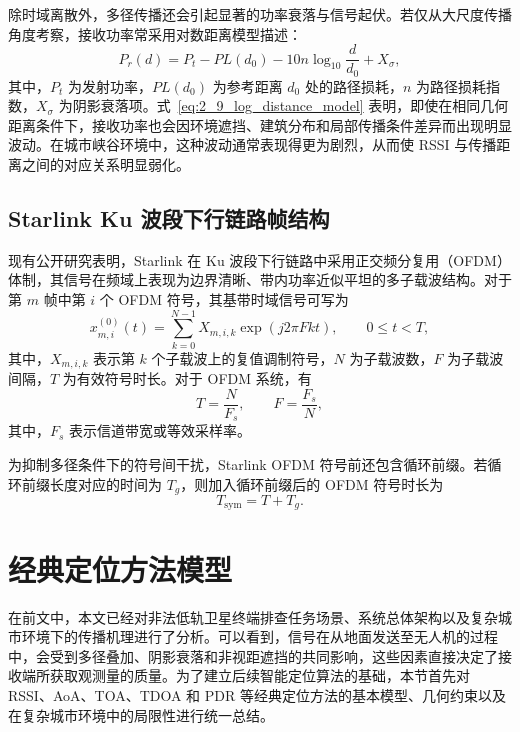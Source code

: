 除时域离散外，多径传播还会引起显著的功率衰落与信号起伏。若仅从大尺度传播角度考察，接收功率常采用对数距离模型描述：
\begin{equation}
P_r(d)
=
P_t
-
PL(d_0)
-
10n\log_{10}\frac{d}{d_0}
+
X_{\sigma},
\label{eq:2_9_log_distance_model}
\end{equation}
其中，$P_t$ 为发射功率，$PL(d_0)$ 为参考距离 $d_0$ 处的路径损耗，$n$ 为路径损耗指数，$X_{\sigma}$ 为阴影衰落项。式~\eqref{eq:2_9_log_distance_model} 表明，即使在相同几何距离条件下，接收功率也会因环境遮挡、建筑分布和局部传播条件差异而出现明显波动。在城市峡谷环境中，这种波动通常表现得更为剧烈，从而使 RSSI 与传播距离之间的对应关系明显弱化。


\subsection{Starlink Ku 波段下行链路帧结构}
\label{subsec:2_2_2}

现有公开研究表明，Starlink 在 Ku 波段下行链路中采用正交频分复用（OFDM）体制，其信号在频域上表现为边界清晰、带内功率近似平坦的多子载波结构。对于第 $m$ 帧中第 $i$ 个 OFDM 符号，其基带时域信号可写为
\begin{equation}
x^{(0)}_{m,i}(t)
=
\sum_{k=0}^{N-1}
X_{m,i,k}
\exp(j2\pi Fkt),
\qquad 0\le t<T,
\label{eq:2_10_starlink_ofdm_symbol}
\end{equation}
其中，$X_{m,i,k}$ 表示第 $k$ 个子载波上的复值调制符号，$N$ 为子载波数，$F$ 为子载波间隔，$T$ 为有效符号时长。对于 OFDM 系统，有
\begin{equation}
T=\frac{N}{F_s},
\qquad
F=\frac{F_s}{N},
\label{eq:2_11_starlink_ofdm_basic}
\end{equation}
其中，$F_s$ 表示信道带宽或等效采样率。

为抑制多径条件下的符号间干扰，Starlink OFDM 符号前还包含循环前缀。若循环前缀长度对应的时间为 $T_g$，则加入循环前缀后的 OFDM 符号时长为
\begin{equation}
T_{\mathrm{sym}}=T+T_g.
\label{eq:2_12_starlink_symbol_duration}
\end{equation}

\section{经典定位方法模型}
\label{sec:2_3}

在前文中，本文已经对非法低轨卫星终端排查任务场景、系统总体架构以及复杂城市环境下的传播机理进行了分析。可以看到，信号在从地面发送至无人机的过程中，会受到多径叠加、阴影衰落和非视距遮挡的共同影响，这些因素直接决定了接收端所获取观测量的质量。为了建立后续智能定位算法的基础，本节首先对 RSSI、AoA、TOA、TDOA 和 PDR 等经典定位方法的基本模型、几何约束以及在复杂城市环境中的局限性进行统一总结。


